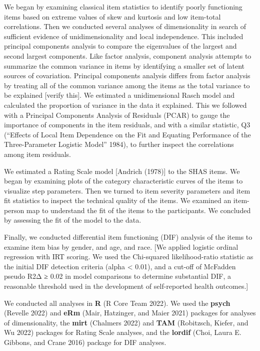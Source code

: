 \documentclass[
  letterpaper,
  DIV=11,
  numbers=noendperiod]{scrreport}
\begin{document}
We began by examining classical item statistics to identify poorly
functioning items based on extreme values of skew and kurtosis and low
item-total correlations. Then we conducted several analyses of
dimensionality in search of sufficient evidence of unidimensionality and
local independence. This included principal components analysis to
compare the eigenvalues of the largest and second largest components.
Like factor analysis, component analysis attempts to summarize the
common variance in items by identifying a smaller set of latent sources
of covariation. Principal components analysis differs from factor
analysis by treating all of the common variance among the items as the
total variance to be explained {[}verify this{]}. We estimated a
unidimensional Rasch model and calculated the proportion of variance in
the data it explained. This we followed with a Principal Components
Analysis of Residuals (PCAR) to gauge the importance of components in
the item residuals, and with a similar statistic, Q3 ({``Effects of
Local Item Dependence on the Fit and Equating Performance of the
Three-Parameter Logistic Model''} 1984), to further inspect the
correlations among item residuals.

We estimated a Rating Scale model {[}Andrich (1978){]} to the SHAS
items. We began by examining plots of the category characteristic curves
of the items to visualize step parameters. Then we turned to item
severity parameters and item fit statistics to inspect the technical
quality of the items. We examined an item-person map to understand the
fit of the items to the participants. We concluded by assessing the fit
of the model to the data.

Finally, we conducted differential item functioning (DIF) analysis of
the items to examine item bias by gender, and age, and race. {[}We
applied logistic ordinal regression with IRT scoring. We used the
Chi-squared likelihood-ratio statistic as the initial DIF detection
criteria (alpha \textless{} 0.01), and a cut-off of McFadden pseudo R2Δ
≥ 0.02 in model comparisons to determine substantial DIF, a reasonable
threshold used in the development of self-reported health outcomes.{]}

We conducted all analyses in \textbf{R} (R Core Team 2022). We used the
\textbf{psych} (Revelle 2022) and \textbf{eRm} (Mair, Hatzinger, and
Maier 2021) packages for analyses of dimensionality, the \textbf{mirt}
(Chalmers 2022) and \textbf{TAM} (Robitzsch, Kiefer, and Wu 2022)
packages for Rating Scale analyses, and the \textbf{lordif} (Choi, Laura
E. Gibbons, and Crane 2016) package for DIF analyses.
\end{document}
